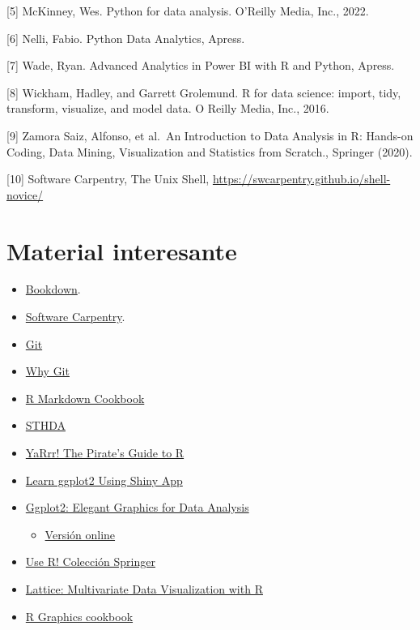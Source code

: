 \documentclass[
]{book}
\providecommand{\tightlist}{%
  \setlength{\itemsep}{0pt}\setlength{\parskip}{0pt}}
\begin{document}
{[}5{]} McKinney, Wes. Python for data analysis. O'Reilly Media, Inc., 2022.

{[}6{]} Nelli, Fabio. Python Data Analytics, Apress.

{[}7{]} Wade, Ryan. Advanced Analytics in Power BI with R and Python, Apress.

{[}8{]} Wickham, Hadley, and Garrett Grolemund. R for data science: import, tidy, transform, visualize, and
model data. O Reilly Media, Inc., 2016.

{[}9{]} Zamora Saiz, Alfonso, et al.~An Introduction to Data Analysis in R: Hands-on Coding, Data Mining,
Visualization and Statistics from Scratch., Springer (2020).

{[}10{]} Software Carpentry, The Unix Shell, \url{https://swcarpentry.github.io/shell-novice/}

\hypertarget{material-interesante}{%
\section{Material interesante}\label{material-interesante}}

\begin{itemize}
\tightlist
\item
  \href{https://bookdown.org/}{Bookdown}.
\item
  \href{https://swcarpentry.github.io/r-novice-gapminder/}{Software Carpentry}.
\item
  \href{https://swcarpentry.github.io/git-novice/14-supplemental-rstudio/}{Git}
\item
  \href{https://info5940.infosci.cornell.edu/setup/git/what-is-git/}{Why Git}
\item
  \href{https://bookdown.org/yihui/rmarkdown-cookbook/}{R Markdown Cookbook}
\item
  \href{http://www.sthda.com/english/wiki/data-visualization}{STHDA}
\item
  \href{https://bookdown.org/ndphillips/YaRrr/}{YaRrr! The Pirate's Guide to R}
\item
  \href{https://link.springer.com/book/10.1007/978-3-319-53019-2}{Learn ggplot2 Using Shiny App}
\item
  \href{https://link.springer.com/book/10.1007/978-0-387-98141-3}{Ggplot2: Elegant Graphics for Data Analysis}

  \begin{itemize}
  \tightlist
  \item
    \href{https://ggplot2-book.org/index.html}{Versión online}
  \end{itemize}
\item
  \href{https://www.springer.com/series/6991/books}{Use R! Colección Springer}
\item
  \href{https://link.springer.com/book/10.1007/978-0-387-75969-2}{Lattice: Multivariate Data Visualization with R}
\item
  \href{http://www.cookbook-r.com/}{R Graphics cookbook}
\end{itemize}
\end{document}

